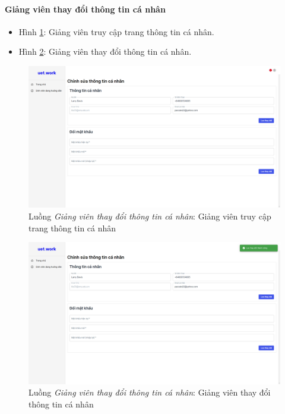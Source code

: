 \documentclass[./../main.tex]{subfiles}
\begin{document}
\paragraph*{Giảng viên thay đổi thông tin cá nhân}

\begin{itemize}
	\item Hình \ref{fig:lecturer_access_info_page}: Giảng viên truy cập trang thông tin cá nhân.
	\item Hình \ref{fig:lecturer_edit_info}: Giảng viên thay đổi thông tin cá nhân.
\end{itemize}

\begin{figure}[]
	\includegraphics[width=\linewidth]{./images/image51.png}
	\caption{Luồng \emph{Giảng viên thay đổi thông tin cá nhân}: Giảng viên truy cập trang thông tin cá nhân}
	\label{fig:lecturer_access_info_page}
\end{figure}

\begin{figure}[]
	\includegraphics[width=\linewidth]{./images/image52.png}
	\caption{Luồng \emph{Giảng viên thay đổi thông tin cá nhân}: Giảng viên thay đổi thông tin cá nhân}
	\label{fig:lecturer_edit_info}
\end{figure}
\end{document}
